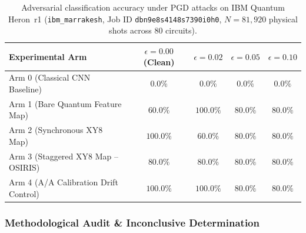 \documentclass[aps,preprint,superscriptaddress,longbibliography]{revtex4-2}
\begin{document}
\begin{table}[H]
\centering
\caption{Adversarial classification accuracy under PGD attacks on IBM Quantum Heron~r1 (\texttt{ibm\_marrakesh}, Job ID \texttt{dbn9e8s4148s7390i0h0}, $N = 81{,}920$ physical shots across 80 circuits).}
\label{tab:qaml_results}
\begin{tabular}{lcccc}
\toprule
Experimental Arm & $\epsilon = 0.00$ (Clean) & $\epsilon = 0.02$ & $\epsilon = 0.05$ & $\epsilon = 0.10$ \\
\midrule
Arm 0 (Classical CNN Baseline) & $0.0\%$ & $0.0\%$ & $0.0\%$ & $0.0\%$ \\
Arm 1 (Bare Quantum Feature Map) & $60.0\%$ & $100.0\%$ & $80.0\%$ & $80.0\%$ \\
Arm 2 (Synchronous XY8 Map) & $100.0\%$ & $60.0\%$ & $80.0\%$ & $80.0\%$ \\
Arm 3 (Staggered XY8 Map -- OSIRIS) & $80.0\%$ & $80.0\%$ & $80.0\%$ & $80.0\%$ \\
Arm 4 (A/A Calibration Drift Control) & $100.0\%$ & $100.0\%$ & $80.0\%$ & $80.0\%$ \\
\bottomrule
\end{tabular}
\end{table}

\subsubsection{Methodological Audit \& Inconclusive Determination}
\label{sec:qaml_inconclusive}
\end{document}

